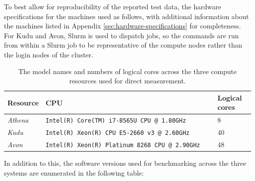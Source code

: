 To best allow for reproducibility of the reported test data, the hardware specifications for the machines used as follows, with additional information about the machines listed in Appendix \ref{sec:hardware-specifications} for completeness. For Kudu and Avon, Slurm is used to dispatch jobs, so the commands are run from within a Slurm job to be representative of the compute nodes rather than the login nodes of the cluster.

\begin{table}[H]
    \caption{The model names and numbers of logical cores across the three compute resources used for direct measurement.}
    \label{table:compute-resource-cpus}
    \begin{tabular}{|p{0.15\linewidth}||p{0.7\linewidth}|p{0.15\linewidth}|}
    \hline
    \textbf{Resource} & \textbf{CPU}                                            & \textbf{Logical cores} \\ \hline\hline
    \textit{Athena}   & \texttt{Intel(R) Core(TM) i7-8565U CPU @ 1.80GHz}     & 8                      \\ \hline
    \textit{Kudu}     & \texttt{Intel(R) Xeon(R) CPU E5-2660 v3 @ 2.60GHz}    & 40                     \\ \hline
    \textit{Avon}     & \texttt{Intel(R) Xeon(R) Platinum 8268 CPU @ 2.90GHz} & 48                     \\ \hline
    \end{tabular}
\end{table}

In addition to this, the software versions used for benchmarking across the three systems are enumerated in the following table:

